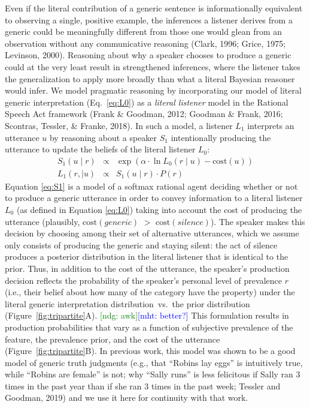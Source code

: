 \documentclass[floatsintext,doc]{apa6}
\newcommand{\mht}[1]{{\textcolor{Blue}{[mht: #1]}}}
\newcommand{\ndg}[1]{{\textcolor{Green}{[ndg: #1]}}}
\begin{document}
Even if the literal contribution of a generic sentence is informationally equivalent to observing a single, positive example, the inferences a listener derives from a generic could be meaningfully different from those one would glean from an observation without any communicative reasoning  (Clark, 1996; Grice, 1975; Levinson, 2000).
Reasoning about why a speaker chooses to produce a generic could at the very least result in strengthened inferences, where the listener takes the generalization to apply more broadly than what a literal Bayesian reasoner would infer. 
We model pragmatic reasoning by incorporating our model of literal generic interpretation (Eq.~\ref{eq:L0}) as a \emph{literal listener} model in the Rational Speech Act framework (Frank \& Goodman, 2012; Goodman \& Frank, 2016; Scontras, Tessler, \& Franke, 2018).
In such a model, a listener \(L_1\) interprets an utterance $u$ by reasoning about a speaker \(S_1\) intentionally producing the utterance to update the beliefs of the literal listener \(L_0\):
\begin{eqnarray}
S_1(u \mid r) &\propto& \exp{(\alpha \cdot \ln L_0(r \mid u) - \text{cost}(u))} \label{eq:S1} \\
L_1(r, \mid u) &\propto& S_1(u \mid r) \cdot P(r) \label{eq:L1}
\end{eqnarray}
Equation \ref{eq:S1} is a model of a softmax rational agent deciding whether or not to produce a generic utterance in order to convey information to a literal listener $L_0$  (as defined in Equation \ref{eq:L0}) taking into account the cost of producing the utterance (plausibly, \(\text{cost}(generic)\) \(>\) \(\text{cost}(silence)\)).
The speaker makes this decision by choosing among their set of alternative utterances, which we assume only consists of producing the generic and staying silent: the act of silence produces a posterior distribution in the literal listener that is identical to the prior.
Thus, in addition to the cost of the utterance, the speaker's production decision reflects the probability of the speaker's personal level of prevalence $r$ (i.e., their belief about how many of the category have the property) under the literal generic interpretation distribution~vs.~the prior distribution (Figure~\ref{fig:tripartite}A). \ndg{awk}\mht{better?}
This formulation results in production probabilities that vary as a function of subjective prevalence of the feature, the prevalence prior, and the cost of the utterance (Figure~\ref{fig:tripartite}B).
In previous work, this model was shown to be a good model of generic truth judgments (e.g., that ``Robins lay eggs'' is intuitively true, while ``Robins are female'' is not; why ``Sally runs'' is less felicitous if Sally ran 3 times in the past year than if she ran 3 times in the past week; Tessler and Goodman, 2019) and we use it here for continuity with that work. 
\end{document}
